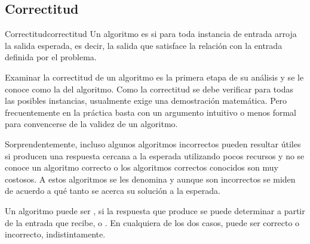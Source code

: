 \subsection{Correctitud}
\label{sec:correctitud}

\begin{definicion}{Correctitud}{correctitud}
  Un algoritmo es  si para toda instancia de entrada arroja la salida esperada, es decir, la salida que satisface la relación con la entrada definida por el problema.
\end{definicion}

Examinar la correctitud de un algoritmo es la primera etapa de su análisis y se le conoce como la  del algoritmo. Como la correctitud se debe verificar para todas las posibles instancias, usualmente exige una demostración matemática. Pero frecuentemente en la práctica basta con un argumento intuitivo o menos formal para convencerse de la validez de un algoritmo.

Sorprendentemente, incluso algunos algoritmos incorrectos pueden resultar útiles si producen una respuesta cercana a la esperada utilizando pocos recursos y no se conoce un algoritmo correcto o los algoritmos correctos conocidos son muy costosos. A estos algoritmos se les denomina  y aunque son incorrectos se miden de acuerdo a qué tanto se acerca su solución a la esperada.

Un algoritmo puede ser , si la respuesta que produce se puede determinar a partir de la entrada que recibe, o . En cualquiera de los dos casos, puede ser correcto o incorrecto, indistintamente.
